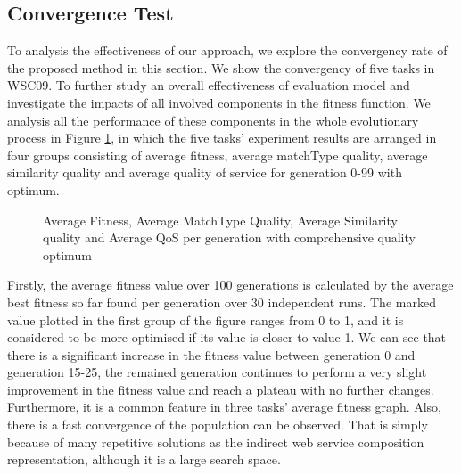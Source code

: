 \documentclass{llncs}
\begin{document}
\subsection{Convergence Test}\label{convergenceTest}
To analysis the effectiveness of our approach, we explore the convergency rate of the proposed method in this section. We show the convergency of five tasks in WSC09. To further study an overall effectiveness of evaluation model and investigate the impacts of all involved components in the fitness function. We analysis all the performance of these components in the whole evolutionary process in Figure \ref{exp_fitnessvalue}, in which the five tasks' experiment results are arranged in four groups consisting of average fitness, average matchType quality, average similarity quality and average quality of service for generation 0-99 with optimum.
\begin{figure}[h]
\centerline{
}
 \caption{Average Fitness, Average MatchType Quality, Average Similarity quality and Average QoS per generation with comprehensive quality optimum}
 \label{exp_fitnessvalue}
\end{figure}

Firstly, the average fitness value over 100 generations is calculated by the average best fitness so far found per generation over 30 independent runs. The marked value plotted in the first group of the figure ranges from 0 to 1, and it is considered to be more optimised if its value is closer to value 1. We can see that there is a significant increase in the fitness value between generation 0 and generation 15-25, the remained generation continues to perform a very slight improvement in the fitness value and reach a plateau with no further changes. Furthermore, it is a common feature in three tasks’ average fitness graph. Also, there is a fast convergence of the population can be observed. That is simply because of many repetitive solutions as the indirect web service composition representation, although it is a large search space.
\end{document}
